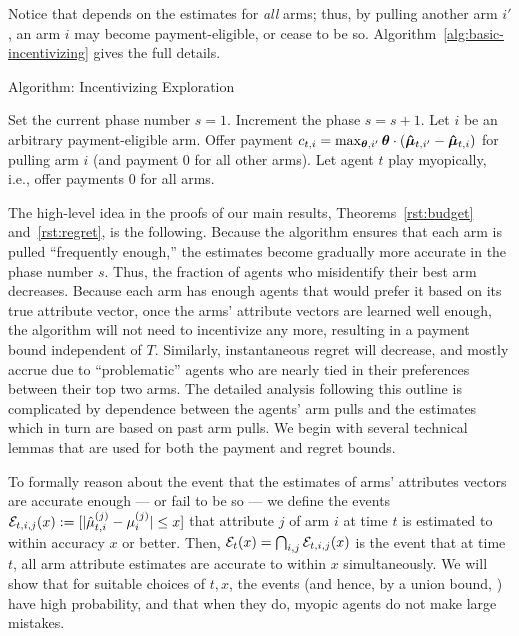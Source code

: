 Notice that  depends on the estimates for \emph{all}
arms; thus, by pulling another arm $i'$, an arm $i$ may become
payment-eligible, or cease to be so.
Algorithm~\ref{alg:basic-incentivizing} gives the full details.


\begin{algorithm}
\caption{Algorithm: Incentivizing Exploration \label{alg:basic-incentivizing}}
\begin{algorithmic}
\STATE Set the current phase number $s = 1$.
\STATE Increment the phase $s = s + 1$.
\ENDIF
{}
\STATE Let $i$ be an arbitrary payment-eligible arm.
\STATE Offer payment
$c_{t,i} = \max_{\bm{\theta},i'} \bm{\theta} \cdot (\bm{\hat{\mu}}_{t,i'} - \bm{\hat{\mu}}_{t,i})$
for pulling arm $i$
(and payment 0 for all other arms).
\ELSE
\STATE Let agent $t$ play myopically, i.e., offer payments 0 for all arms.
\ENDIF
\ENDFOR
\end{algorithmic}
\end{algorithm}

The high-level idea in the proofs of our main results, Theorems~\ref{rst:budget} and~\ref{rst:regret},
is the following.
Because the algorithm ensures that each arm is pulled
``frequently enough,''
the estimates  become gradually more accurate in the
phase number $s$.
Thus, the fraction of agents who misidentify their best arm decreases.
Because each arm has enough agents that would prefer it based
  on its true attribute vector, 
once the arms' attribute vectors are learned well enough,
the algorithm will not need to incentivize any more,
resulting in a payment bound independent of $T$.
Similarly, instantaneous regret will decrease, and mostly accrue
due to ``problematic'' agents who are nearly tied in their preferences
between their top two arms.
The detailed analysis following this outline is complicated by
dependence between the agents' arm pulls and the
estimates which in turn are based on past arm pulls.
We begin with several technical lemmas that are used for both the
payment and regret bounds.

To formally reason about the event that the estimates of arms'
attributes vectors are accurate enough --- or fail to be so ---
we define the events
${\mathcal E}_{t,i,j}(x) := [|\hat{\mu}_{t,i}^{(j)} - \mu_{i}^{(j)}| \leq x]$
that attribute $j$ of arm $i$ at time $t$ is estimated to
within accuracy $x$ or better.
Then, 
${\mathcal E}_{t}(x) = \bigcap_{i,j} {\mathcal E}_{t,i,j}(x)$
is the event that at time $t$, all arm attribute
estimates are accurate to within $x$ simultaneously.
We will show that for suitable choices of $t, x$,
the events 
(and hence, by a union bound, )
have high probability,
and that when they do, myopic agents do not make large mistakes.



